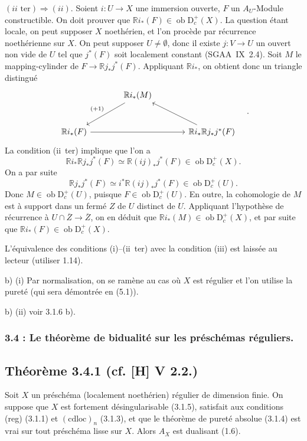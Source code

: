 \documentclass[11pt]{article}
\newcommand{\R}{\mathbb{R}}\newcommand{\RHomCore}{\mathbb{R}\mathrm{Hom}}
\newcommand{\D}{\mathrm{D}}
\newcommand{\ob}{\operatorname{ob}}
\newcommand{\ol}[1]{\overline{#1}}
\providecommand{\ob}{\operatorname{ob}}
\providecommand{\R}{\mathrm R}
\begin{document}
$(ii\text{~ter}) \Rightarrow (ii)$. Soient $i : U \to X$ une immersion ouverte, $F$ un $A_U$-Module constructible. On doit prouver que $\R i_{*}(F) \in \ob \D_c^{+}(X)$. La question étant locale, on peut supposer $X$ noethérien, et l'on procède par récurrence noethérienne sur $X$. On peut supposer $U \neq \emptyset$, donc il existe 
$j : V \to U$ un
ouvert non vide de $U$ tel que $j^{*}(F)$ soit localement constant (SGAA~IX~2.4). Soit $M$ le mapping-cylinder de $F \to \R j_{*}j^{*}(F)$. Appliquant $\R i_{*}$, on obtient donc un triangle distingué
\[
\begin{tikzcd}[column sep=large,row sep=large]
& \R i_{*}(M) \arrow[dl,"{(+1)}"'] & \\
\R i_{*}(F) \arrow[rr] & & \R i_{*}\R j_{*}j^{*}(F) \arrow[ul]
\end{tikzcd}\quad .
\]
La condition (ii~ter) implique que l'on a
\[
\R i_{*} \R j_{*} j^{*}(F) \simeq \R(ij)_{*} j^{*}(F) \in \ob \D_c^{+}(X).
\]
On a par suite
\[
\R j_{*}j^{*}(F) \simeq i^{*} \R(ij)_{*} j^{*}(F) \in \ob \D_c^{+}(U).
\]
Donc $M \in \ob \D_c^{+}(U)$, puisque $F \in \ob \D_c^{+}(U)$. En outre, la cohomologie de $M$ est à support dans un fermé $Z$ de $U$ distinct de $U$. Appliquant l'hypothèse de récurrence à $U \cap \ol{Z} \to \ol{Z}$, on en déduit que $\R i_{*}(M) \in \ob \D_c^{+}(X)$, et par suite que $\R i_{*}(F) \in \ob \D_c^{+}(X)$.

L'équivalence des conditions (i)--(ii~ter) avec la condition (iii) est laissée au lecteur (utiliser 1.14).

b) (i) Par normalisation, on se ramène au cas où $X$ est régulier et l'on utilise la pureté (qui sera démontrée en (5.1)).

b) (ii) voir 3.1.6 b).

\subsubsection*{3.4 : Le théorème de bidualité sur les préschémas réguliers.}

\subsection*{Théorème 3.4.1 (cf. [H] V 2.2.)}
Soit $X$ un préschéma (localement noethérien) régulier de dimension finie. On suppose que $X$ est fortement désingularisable (3.1.5), satisfait aux conditions (reg) (3.1.1) et $(\mathrm{cdloc})_n$ (3.1.3), et que le théorème de pureté absolue (3.1.4) est vrai sur tout préschéma lisse sur $X$. Alors $A_X$ est dualisant (1.6).
\end{document}
